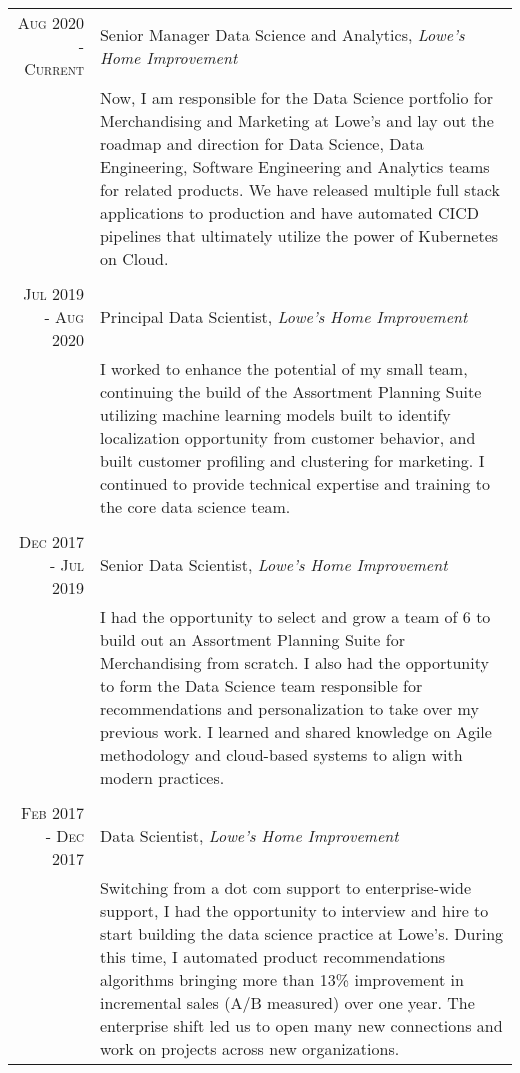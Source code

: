 \documentclass[a4paper,10pt]{article} %
\begin{document}
\begin{tabular}{r|p{11cm}}

\textsc{Aug 2020 - Current} & Senior Manager Data Science and Analytics, \emph{Lowe's Home Improvement} \\
& \footnotesize{Now, I am responsible for the Data Science portfolio for Merchandising and Marketing at Lowe's and lay out the roadmap and direction for Data Science, Data Engineering, Software Engineering and Analytics teams for related products. We have released multiple full stack applications to production and have automated CICD pipelines that ultimately utilize the power of Kubernetes on Cloud.}\\

\multicolumn{2}{c}{} \\


\textsc{Jul 2019 - Aug 2020} & Principal Data Scientist, \emph{Lowe's Home Improvement} \\
& \footnotesize{I worked to enhance the potential of my small team, continuing the build of the Assortment Planning Suite utilizing machine learning models built to identify localization opportunity from customer behavior, and built customer profiling and clustering for marketing. I continued to provide technical expertise and training to the core data science team.}\\

\multicolumn{2}{c}{} \\


\textsc{Dec 2017 - Jul 2019} & Senior Data Scientist, \emph{Lowe's Home Improvement} \\
& \footnotesize{I had the opportunity to select and grow a team of 6 to build out an Assortment Planning Suite for Merchandising from scratch. I also had the opportunity to form the Data Science team responsible for recommendations and personalization to take over my previous work. I learned and shared knowledge on Agile methodology and cloud-based systems to align with modern practices.}\\

\multicolumn{2}{c}{} \\


\textsc{Feb 2017 - Dec 2017} & Data Scientist, \emph{Lowe's Home Improvement} \\
& \footnotesize{Switching from a dot com support to enterprise-wide support, I had the opportunity to interview and hire to start building the data science practice at Lowe's. During this time, I automated product recommendations algorithms bringing more than 13\% improvement in incremental sales (A/B measured) over one year. The enterprise shift led us to open many new connections and work on projects across new organizations.}\\


\end{tabular}
\end{document}
